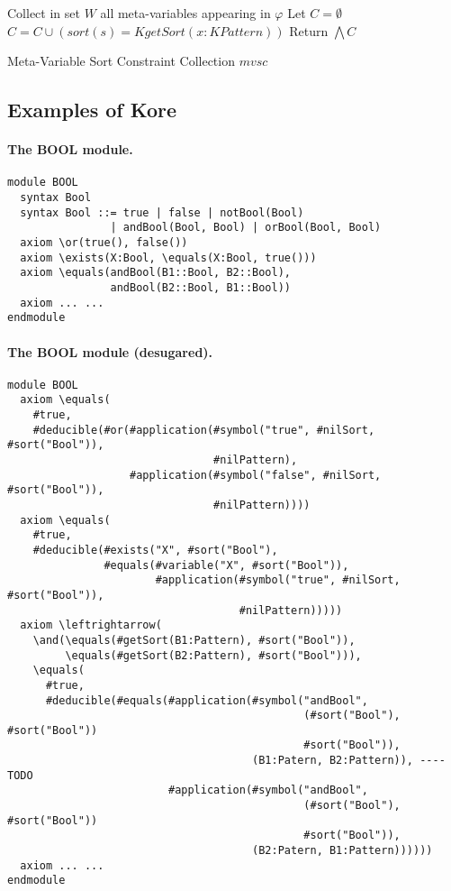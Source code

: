 \documentclass[UTF8,11pt]{article}
\theoremstyle{plain}
\theoremstyle{definition}
\theoremstyle{remark}
\newcommand{\cln}{{:}}
\newcommand{\KPattern}{\mathit{KPattern}}
\newcommand{\KgetSort}{\mathit{KgetSort}}
\begin{document}
\begin{algorithm}
	Collect in set $W$ all meta-variables appearing in $\varphi$\;
	Let $C = \emptyset$\;
	\ForEach{$x \cln \cln s \in W$}
	{$C = C \cup (\mathit{sort(s)} = \KgetSort(x \cln \KPattern))$}
	Return $\bigwedge C$\;
	\caption{Meta-Variable Sort Constraint Collection $\mathit{mvsc}$}
	\label{alg:mvsc}
\end{algorithm}


\subsection{Examples of Kore}
\label{sec:examples-of-kore}


\paragraph{The {\small BOOL} module.}\quad
\begin{Verbatim}[fontsize=\small]
module BOOL
  syntax Bool
  syntax Bool ::= true | false | notBool(Bool)
                | andBool(Bool, Bool) | orBool(Bool, Bool)
  axiom \or(true(), false())
  axiom \exists(X:Bool, \equals(X:Bool, true()))
  axiom \equals(andBool(B1::Bool, B2::Bool), 
                andBool(B2::Bool, B1::Bool))
  axiom ... ...
endmodule
\end{Verbatim}

\paragraph{The {\small BOOL} module (desugared).}\quad
\begin{Verbatim}[fontsize=\small]
module BOOL
  axiom \equals(
    #true,
    #deducible(#or(#application(#symbol("true", #nilSort, #sort("Bool")),
                                #nilPattern), 
                   #application(#symbol("false", #nilSort, #sort("Bool")),
                                #nilPattern))))
  axiom \equals(
    #true,
    #deducible(#exists("X", #sort("Bool"), 
               #equals(#variable("X", #sort("Bool")), 
                       #application(#symbol("true", #nilSort, #sort("Bool")),
                                    #nilPattern)))))
  axiom \leftrightarrow(
    \and(\equals(#getSort(B1:Pattern), #sort("Bool")), 
         \equals(#getSort(B2:Pattern), #sort("Bool"))),
    \equals(
      #true,
      #deducible(#equals(#application(#symbol("andBool", 
                                              (#sort("Bool"), #sort("Bool"))
                                              #sort("Bool")), 
                                      (B1:Patern, B2:Pattern)), ---- TODO
                         #application(#symbol("andBool", 
                                              (#sort("Bool"), #sort("Bool"))
                                              #sort("Bool")), 
                                      (B2:Patern, B1:Pattern))))))
  axiom ... ...
endmodule
\end{Verbatim}
\end{document}
